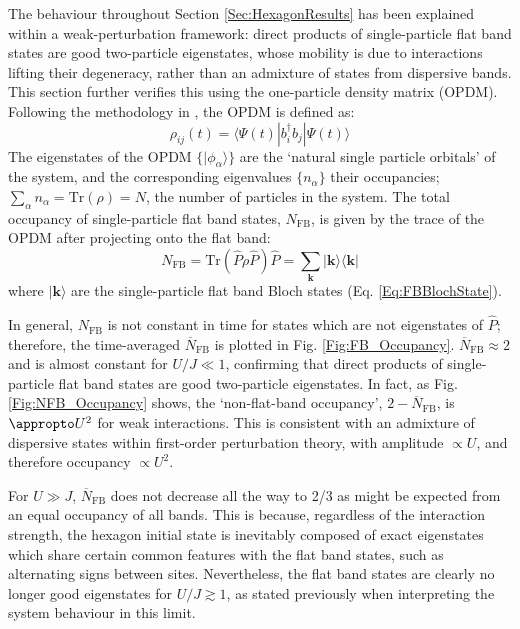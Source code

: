 The behaviour throughout Section \ref{Sec:HexagonResults} has been explained within a weak-perturbation framework: direct products of single-particle flat band states are good two-particle eigenstates, whose mobility is due to interactions lifting their degeneracy, rather than an admixture of states from dispersive bands. This section further verifies this using the one-particle density matrix (OPDM). Following the methodology in \cite{Bera,Lezama}, the OPDM is defined as:
\begin{equation}\label{Eq:OPDM}
    \rho_{ij}(t)=\langle \Psi(t)|b_i^{\dag}b_j|\Psi(t)\rangle
\end{equation}
The eigenstates of the OPDM $\{|\phi_\alpha\rangle\}$ are the `natural single particle orbitals' of the system, and the corresponding eigenvalues $\{n_\alpha\}$ their occupancies; $\sum_{\alpha} n_{\alpha}=\text{Tr}(\rho)=N$, the number of particles in the system. The total occupancy of single-particle flat band states, $N_{\text{FB}}$, is given by the trace of the OPDM after projecting onto the flat band:%
\begin{subequations}
    \begin{equation}
        N_{\text{FB}}=\text{Tr}(\hat{P}\rho\hat{P})
    \end{equation}
    \begin{equation}
        \hat{P} = \sum_{\textbf{k}}|\textbf{k}\rangle \langle \textbf{k}|
    \end{equation}
\end{subequations}
where $|\textbf{k}\rangle$ are the single-particle flat band Bloch states (Eq. \ref{Eq:FBBlochState}). 

 In general, $N_{\text{FB}}$ is not constant in time for states which are not eigenstates of $\hat{P}$; therefore, the time-averaged $\overline{N}_{\text{FB}}$ is plotted in Fig. \ref{Fig:FB_Occupancy}. $\overline{N}_{\text{FB}}\approx2$ and is almost constant for $U/J\ll 1$, confirming that direct products of single-particle flat band states are good two-particle eigenstates. In fact, as Fig. \ref{Fig:NFB_Occupancy} shows, the `non-flat-band occupancy', $2-\overline{N}_{\text{FB}}$, is $\appropto U^2$ for weak interactions. This is consistent with an admixture of dispersive states within first-order perturbation theory, with amplitude $\propto U$, and therefore occupancy $\propto U^2$.

For $U\gg J$, $\overline{N}_{\text{FB}}$ does not decrease all the way to 2/3 as might be expected from an equal occupancy of all bands. This is because, regardless of the interaction strength, the hexagon initial state is inevitably composed of exact eigenstates which share certain common features with the flat band states, such as alternating signs between sites. Nevertheless, the flat band states are clearly no longer good eigenstates for $U/J\gtrsim 1$, as stated previously when interpreting the system behaviour in this limit.

